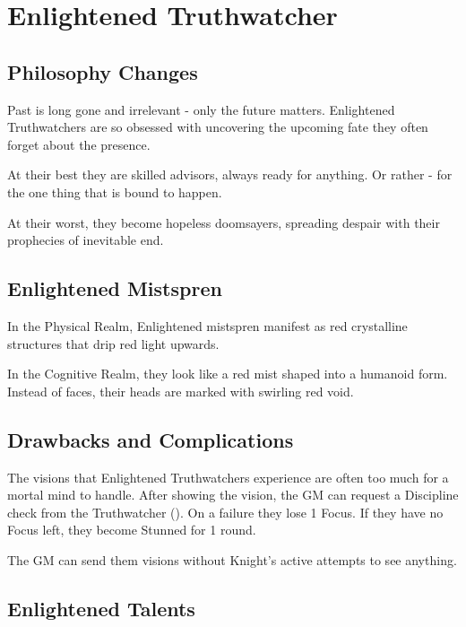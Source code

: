 \newpage
\section{Enlightened Truthwatcher}


\subsection{Philosophy Changes}

Past is long gone and irrelevant - only the future matters. Enlightened Truthwatchers are so obsessed with uncovering the upcoming fate they often forget about the presence.

At their best they are skilled advisors, always ready for anything. Or rather - for the one thing that is bound to happen.

At their worst, they become hopeless doomsayers, spreading despair with their prophecies of inevitable end.

\subsection{Enlightened Mistspren}

In the Physical Realm, Enlightened mistspren manifest as red crystalline structures that drip red light upwards.

In the Cognitive Realm, they look like a red mist shaped into a humanoid form. Instead of faces, their heads are marked with swirling red void.

\subsection{Drawbacks and Complications}

The visions that Enlightened Truthwatchers experience are often too much for a mortal mind to handle. After showing the vision, the GM can request a Discipline check from the Truthwatcher (\corruptedResistanceDC{}). On a failure they lose 1 Focus. If they have no Focus left, they become Stunned for 1 round.

The GM can send them visions without Knight's active attempts to see anything.

\subsection{Enlightened Talents}

